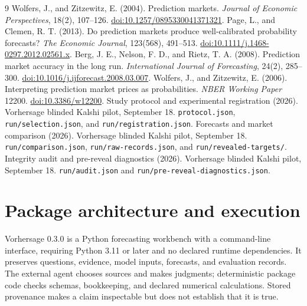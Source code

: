 \documentclass[11pt,letterpaper]{article}
\newcommand{\file}[1]{{\small\nolinkurl{#1}}}
\begin{document}
\begin{thebibliography}{9}
\small
{} Wolfers, J., and Zitzewitz, E. (2004).
Prediction markets. \emph{Journal of Economic Perspectives}, 18(2), 107--126.
\href{https://doi.org/10.1257/0895330041371321}{doi:10.1257/0895330041371321}.
 Page, L., and Clemen, R. T. (2013).
Do prediction markets produce well-calibrated probability forecasts?
\emph{The Economic Journal}, 123(568), 491--513.
\href{https://doi.org/10.1111/j.1468-0297.2012.02561.x}{doi:10.1111/j.1468-0297.2012.02561.x}.
 Berg, J. E., Nelson, F. D., and Rietz, T. A. (2008).
Prediction market accuracy in the long run. \emph{International Journal of
Forecasting}, 24(2), 285--300.
\href{https://doi.org/10.1016/j.ijforecast.2008.03.007}{doi:10.1016/j.ijforecast.2008.03.007}.
 Wolfers, J., and Zitzewitz, E. (2006).
Interpreting prediction market prices as probabilities.
\emph{NBER Working Paper} 12200.
\href{https://doi.org/10.3386/w12200}{doi:10.3386/w12200}.
 Study protocol and experimental registration (2026).
Vorhersage blinded Kalshi pilot, September 18.
\file{protocol.json}, \file{run/selection.json}, and \file{run/registration.json}.
 Forecasts and market comparison (2026).
Vorhersage blinded Kalshi pilot, September 18.
\file{run/comparison.json}, \file{run/raw-records.json}, and
\file{run/revealed-targets/}.
 Integrity audit and pre-reveal diagnostics (2026).
Vorhersage blinded Kalshi pilot, September 18.
\file{run/audit.json} and \file{run/pre-reveal-diagnostics.json}.
\end{thebibliography}
\clearpage
\appendix
\section{Package architecture and execution}
\label{app:package}
Vorhersage 0.3.0 is a Python forecasting workbench with a command-line interface,
requiring Python 3.11 or later and no declared runtime dependencies. It preserves
questions, evidence, model inputs, forecasts, and evaluation records. The
external agent chooses sources and makes judgments; deterministic package code
checks schemas, bookkeeping, and declared numerical calculations. Stored
provenance makes a claim inspectable but does not establish that it is true.
\end{document}
